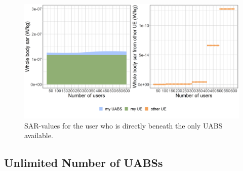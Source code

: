 \documentclass[twocolumn]{phdsymp} %
\begin{document}
\begin{figure}[h]
\centering
  \includegraphics[width=\linewidth]{s2/uvsulsarcentralUser.png}
  \caption{SAR-values for the user who is directly beneath the only \acs{UABS} available.}
  \label{fig:uvsulsarcentralUsers}
\end{figure}

\FloatBarrier
\subsection{Unlimited Number of UABSs}
\end{document}
